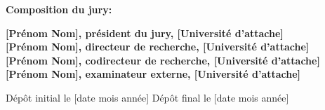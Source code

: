\thispagestyle{empty}

\null
\vfill
\noindent \textbf{Composition du jury:}\\
\vspace{1cm}

\begin{singlespace}
  \noindent \textbf{[Prénom Nom], président du jury, [Université d’attache]}\\

  \noindent \textbf{[Prénom Nom], directeur de recherche, [Université d’attache]}\\

  \noindent \textbf{[Prénom Nom], codirecteur de recherche, [Université d’attache]}\\

  \noindent \textbf{[Prénom Nom], examinateur externe, [Université d’attache]}\\
\end{singlespace}

\vspace{2cm}
\noindent Dépôt initial le [date mois année] 
\hspace{3cm}
Dépôt final le [date mois année]


\cleardoublepage